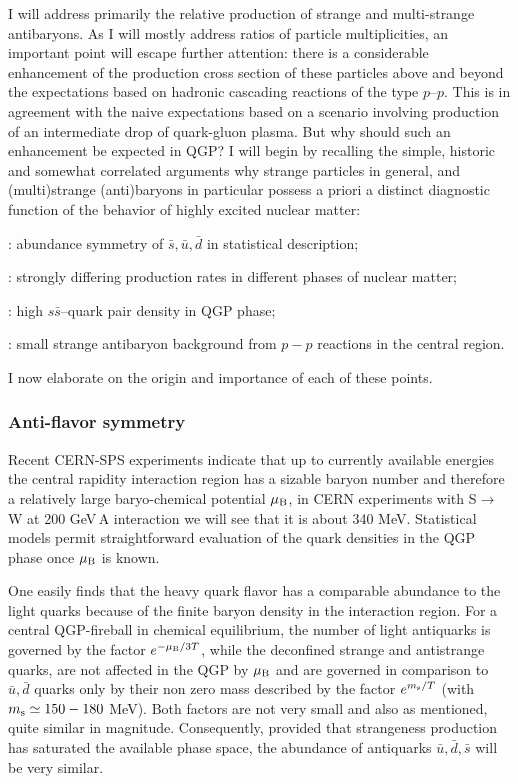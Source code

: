 \begin{mdframed}[linecolor=gray,roundcorner=12pt,backgroundcolor=Dandelion!15,linewidth=1pt,leftmargin=0cm,rightmargin=0cm,topline=true,bottomline=true,skipabove=12pt]
I will address primarily the relative production of strange and
multi-strange antibaryons. As I will mostly address ratios of particle
multiplicities, an important point will escape further attention: there
is a considerable enhancement of the production cross section of these
particles above and beyond the expectations based on hadronic cascading
reactions of the type $p$--$p$. This is in agreement with the naive
expectations based on a scenario involving production of an intermediate
drop of quark-gluon plasma. But why should such an enhancement be
expected in QGP? I will begin by recalling the simple, historic and
somewhat correlated arguments why strange particles in general, and
(multi)strange  (anti)baryons in particular possess a priori a distinct
diagnostic function of the behavior of highly excited nuclear matter:\par
{}: abundance symmetry of $\bar s, \bar u, \bar d$ in statistical
description;\par
{}: strongly differing production rates in different phases of
nuclear matter;\par
{}: high  $s\bar s$--quark pair density in QGP phase;\par
{}: small strange antibaryon background from $p-p$ reactions in
the central region.\par
\noindent I now elaborate on the origin and importance of each of these
points.
 
\subsubsection*{Anti-flavor symmetry} 
Recent CERN-SPS experiments indicate that up to currently available
energies the central rapidity interaction region has a sizable baryon
number and therefore a relatively large baryo-chemical potential
$\mu_{\rm B}$, in CERN experiments with S$\to$W at 200 GeV\,A interaction
we will see that it is about 340 MeV. Statistical models permit
straightforward evaluation of the quark densities in the QGP phase once
$\mu_{\rm B}$ is known. 
 
One easily finds that the heavy quark flavor has a comparable abundance
to the light quarks because of the finite baryon density in the
interaction region. For a central QGP-fireball in chemical equilibrium,
the number of light antiquarks is governed by the factor $e^{-\mu_{\rm
B}/3T}$, while the deconfined strange and antistrange quarks, are not
affected in the QGP by $\mu_{\rm B}$ and are governed in comparison to
$\bar u, \bar d$ quarks only by their non zero mass described by the
factor $e^{m_{\rm s}/T}$ (with $m_{\rm s}\simeq 150-180$ MeV). Both
factors are not very small and also as mentioned, quite similar in
magnitude. Consequently, provided that strangeness production has
saturated the available phase space, the abundance of antiquarks $\bar u, \bar d, \bar s$ will be very similar.
 

\end{mdframed}
